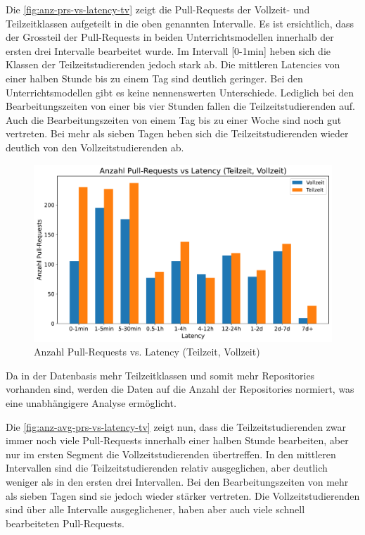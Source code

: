 Die \autoref{fig:anz-prs-vs-latency-tv} zeigt die Pull-Requests der Vollzeit- und Teilzeitklassen aufgeteilt in die oben genannten Intervalle. Es ist ersichtlich, dass der Grossteil der Pull-Requests in beiden Unterrichtsmodellen innerhalb der ersten drei Intervalle bearbeitet wurde. Im Intervall [0-1min] heben sich die Klassen der Teilzeitstudierenden jedoch stark ab. 
Die mittleren Latencies von einer halben Stunde bis zu einem Tag sind deutlich geringer. Bei den Unterrichtsmodellen gibt es keine nennenswerten Unterschiede. Lediglich bei den Bearbeitungszeiten von einer bis vier Stunden fallen die Teilzeitstudierenden auf. Auch die Bearbeitungszeiten von einem Tag bis zu einer Woche sind noch gut vertreten. Bei mehr als sieben Tagen heben sich die Teilzeitstudierenden wieder deutlich von den Vollzeitstudierenden ab.

\begin{figure}[htbp]
    \includegraphics[width=\textwidth]{Figures/anz-prs-vs-latency-tv.pdf}
    \caption{Anzahl Pull-Requests vs. Latency (Teilzeit, Vollzeit)}
    \label{fig:anz-prs-vs-latency-tv}
\end{figure}


Da in der Datenbasis mehr Teilzeitklassen und somit mehr Repositories vorhanden sind, werden die Daten auf die Anzahl der Repositories normiert, was eine unabhängigere Analyse ermöglicht.

Die \autoref{fig:anz-avg-prs-vs-latency-tv} zeigt nun, dass die Teilzeitstudierenden zwar immer noch viele Pull-Requests innerhalb einer halben Stunde bearbeiten, aber nur im ersten Segment die Vollzeitstudierenden übertreffen. In den mittleren Intervallen sind die Teilzeitstudierenden relativ ausgeglichen, aber deutlich weniger als in den ersten drei Intervallen. Bei den Bearbeitungszeiten von mehr als sieben Tagen sind sie jedoch wieder stärker vertreten. Die Vollzeitstudierenden sind über alle Intervalle ausgeglichener, haben aber auch viele schnell bearbeiteten Pull-Requests.


